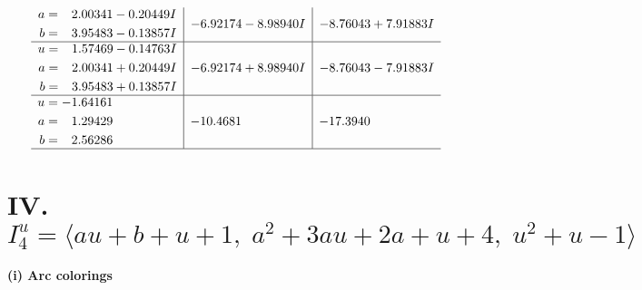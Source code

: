 \documentclass[1p]{elsarticle_modified}
\theoremstyle{definition}
\begin{document}
$$\begin{array}{c|c|c}
\begin{aligned}
a &= \phantom{-}2.00341 - 0.20449 I \\
b &= \phantom{-}3.95483 - 0.13857 I\end{aligned}
 & -6.92174 - 8.98940 I & -8.76043 + 7.91883 I \\ \hline\begin{aligned}
u &= \phantom{-}1.57469 - 0.14763 I \\
a &= \phantom{-}2.00341 + 0.20449 I \\
b &= \phantom{-}3.95483 + 0.13857 I\end{aligned}
 & -6.92174 + 8.98940 I & -8.76043 - 7.91883 I \\ \hline\begin{aligned}
u &= -1.64161\phantom{ +0.000000I} \\
a &= \phantom{-}1.29429\phantom{ +0.000000I} \\
b &= \phantom{-}2.56286\phantom{ +0.000000I}\end{aligned}
 & -10.4681\phantom{ +0.000000I} & -17.3940\phantom{ +0.000000I}\\
 \hline 
 \end{array}$$\newpage\newpage\renewcommand{\arraystretch}{1}
\centering \section*{IV. $I^u_{4}= \langle a u+b+u+1,\;a^2+3 a u+2 a+u+4,\;u^2+u-1 \rangle$}
\flushleft \textbf{(i) Arc colorings}\\
\end{document}
